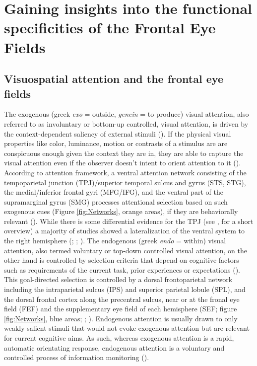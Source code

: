 \documentclass[a4paper, 12pt]{scrreprt}
\begin{document}
\chapter{Gaining insights into the functional specificities of the Frontal Eye Fields}\label{c3}
\section{Visuospatial attention and the frontal eye fields}\label{section:visualattention}
The exogenous (greek \textit{exo} = outside, \textit{genein} = to produce) visual attention, also referred to as involuntary or bottom-up controlled, visual attention, is driven by the context-dependent saliency of external stimuli (\cite{itti2001computational}). If the physical visual properties like color, luminance, motion or contrasts of a stimulus are are conspicuous enough given the context they are in, they are able to capture the visual attention even if the observer doesn’t intent to orient attention to it (\cite{chica2013two}). According to \textcite{corbetta2002control} attention framework, a ventral attention network consisting of the tempoparietal junction (TPJ)/superior temporal sulcus and gyrus (STS, STG), the medial/inferior frontal gyri (MFG/IFG), and the ventral part of the supramarginal gyrus (SMG) processes attentional selection based on such exogenous cues (Figure \ref{fig:Networks}, orange areas), if they are behaviorally relevant (\cite{downar2000multimodal}). While there is some differential evidence for the TPJ (see \textcite{vossel2014dorsal}, for a short overview) a majority of studies showed a lateralization of the ventral system to the right hemisphere (\cite{corbetta2002control}; \cite{fox2006spontaneous}; \cite{corbetta2008reorienting}). \newline 
The endogenous (greek \textit{endo} = within) visual attention, also termed voluntary or top-down controlled visual attention, on the other hand is controlled by selection criteria that depend on cognitive factors such as requirements of the current task, prior experiences or expectations (\cite{itti2001computational}). This goal-directed selection is controlled by a dorsal frontoparietal network including the intraparietal sulcus (IPS) and superior parietal lobule (SPL), and the dorsal frontal cortex along the precentral sulcus, near or at the fronal eye field (FEF) and the supplementary eye field of each hemisphere (SEF; figure \ref{fig:Networks}, blue areas; \cite{corbetta2002control}; \cite{corbetta2008reorienting}). Endogenous attention is usually drawn to only weakly salient stimuli that would not evoke exogenous attention but are relevant for current cognitive aims. As such, whereas exogenous attention is a rapid, automatic orientating response, endogenous attention is a voluntary and controlled process of information monitoring (\cite{carrasco2011visual}).
\end{document}

